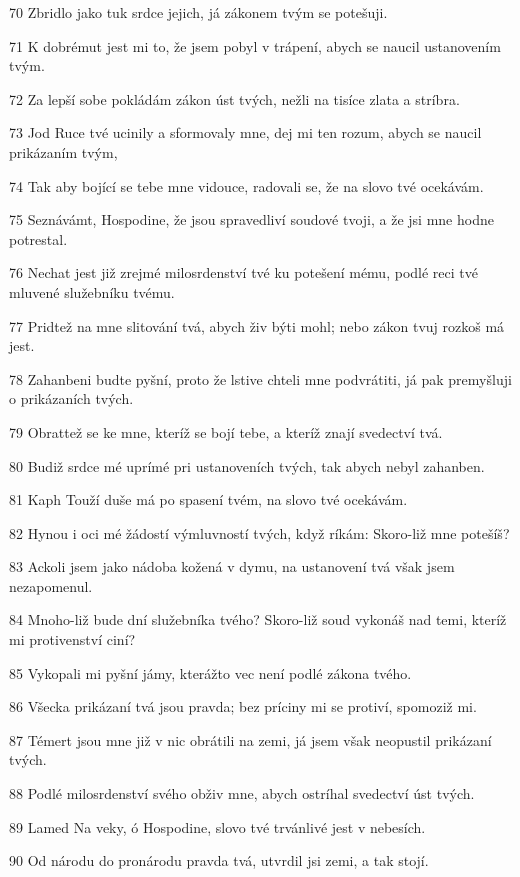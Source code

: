 \par 70 Zbridlo jako tuk srdce jejich, já zákonem tvým se potešuji.
\par 71 K dobrémut jest mi to, že jsem pobyl v trápení, abych se naucil ustanovením tvým.
\par 72 Za lepší sobe pokládám zákon úst tvých, nežli na tisíce zlata a stríbra.
\par 73 Jod Ruce tvé ucinily a sformovaly mne, dej mi ten rozum, abych se naucil prikázaním tvým,
\par 74 Tak aby bojící se tebe mne vidouce, radovali se, že na slovo tvé ocekávám.
\par 75 Seznávámt, Hospodine, že jsou spravedliví soudové tvoji, a že jsi mne hodne potrestal.
\par 76 Nechat jest již zrejmé milosrdenství tvé ku potešení mému, podlé reci tvé mluvené služebníku tvému.
\par 77 Pridtež na mne slitování tvá, abych živ býti mohl; nebo zákon tvuj rozkoš má jest.
\par 78 Zahanbeni budte pyšní, proto že lstive chteli mne podvrátiti, já pak premyšluji o prikázaních tvých.
\par 79 Obrattež se ke mne, kteríž se bojí tebe, a kteríž znají svedectví tvá.
\par 80 Budiž srdce mé uprímé pri ustanoveních tvých, tak abych nebyl zahanben.
\par 81 Kaph Touží duše má po spasení tvém, na slovo tvé ocekávám.
\par 82 Hynou i oci mé žádostí výmluvností tvých, když ríkám: Skoro-liž mne potešíš?
\par 83 Ackoli jsem jako nádoba kožená v dymu, na ustanovení tvá však jsem nezapomenul.
\par 84 Mnoho-liž bude dní služebníka tvého? Skoro-liž soud vykonáš nad temi, kteríž mi protivenství ciní?
\par 85 Vykopali mi pyšní jámy, kterážto vec není podlé zákona tvého.
\par 86 Všecka prikázaní tvá jsou pravda; bez príciny mi se protiví, spomoziž mi.
\par 87 Témert jsou mne již v nic obrátili na zemi, já jsem však neopustil prikázaní tvých.
\par 88 Podlé milosrdenství svého obživ mne, abych ostríhal svedectví úst tvých.
\par 89 Lamed Na veky, ó Hospodine, slovo tvé trvánlivé jest v nebesích.
\par 90 Od národu do pronárodu pravda tvá, utvrdil jsi zemi, a tak stojí.
